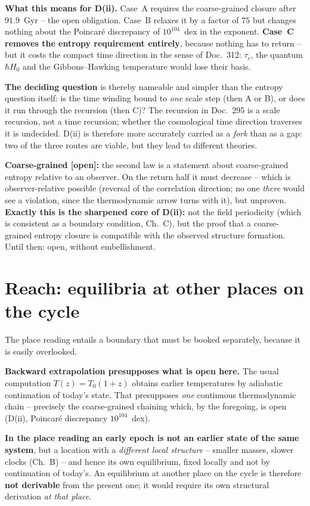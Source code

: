 \textbf{What this means for D(ii).} Case~A requires the
coarse-grained closure after $91.9$~Gyr -- the open obligation.
Case~B relaxes it by a factor of $75$ but changes nothing about
the Poincaré discrepancy of $10^{104}$~dex in the exponent.
\textbf{Case~C removes the entropy requirement entirely}, because
nothing has to return -- but it costs the compact time direction
in the sense of Doc.~312: $\tau_c$, the quantum $\hbar H_0$ and
the Gibbons--Hawking temperature would lose their basis.

\textbf{The deciding question} is thereby nameable and simpler
than the entropy question itself: is the time winding bound to
\emph{one} scale step (then A or B), or does it run through the
recursion (then C)? The recursion in Doc.~295 is a scale
recursion, not a time recursion; whether the cosmological time
direction traverses it is undecided. D(ii) is therefore more
accurately carried as a \emph{fork} than as a gap: two of the
three routes are viable, but they lead to different theories.

\textbf{Coarse-grained [open]:} the second law is a statement
about coarse-grained entropy relative to an observer. On the
return half it must decrease -- which is observer-relative
possible (reversal of the correlation direction; no one
\emph{there} would see a violation, since the thermodynamic arrow
turns with it), but unproven. \textbf{Exactly this is the
sharpened core of D(ii):} not the field periodicity (which is
consistent as a boundary condition, Ch.~C), but the proof that a
coarse-grained entropy closure is compatible with the observed
structure formation. Until then: open, without embellishment.

\section{Reach: equilibria at other places on the cycle}

The place reading entails a boundary that must be booked
separately, because it is easily overlooked.

\textbf{Backward extrapolation presupposes what is open here.}
The usual computation $T(z) = T_0(1+z)$ obtains earlier
temperatures by adiabatic continuation of today's state. That
presupposes \emph{one} continuous thermodynamic chain -- precisely
the coarse-grained chaining which, by the foregoing, is open
(D(ii), Poincaré discrepancy $10^{104}$~dex).

\textbf{In the place reading an early epoch is not an earlier
state of the same system}, but a location with a \emph{different
local structure} -- smaller masses, slower clocks (Ch.~B) -- and
hence its own equilibrium, fixed locally and not by continuation
of today's. An equilibrium at another place on the cycle is
therefore \textbf{not derivable} from the present one; it would
require its own structural derivation \emph{at that place}.

